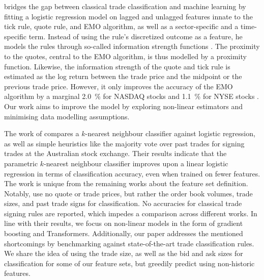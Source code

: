 \textcite[5]{rosenthalModelingTradeDirection2012} bridges the gap between classical trade classification and machine learning by fitting a logistic regression model on lagged and unlagged features innate to the tick rule, quote rule, and \gls{EMO} algorithm, as well as a sector-specific and a time-specific term. Instead of using the rule's discretized outcome as a feature, he models the rules through so-called information strength functions \autocite[6--7]{rosenthalModelingTradeDirection2012}. The proximity to the quotes, central to the \gls{EMO} algorithm, is thus modelled by a proximity function. Likewise, the information strength of the quote and tick rule is estimated as the log return between the trade price and the midpoint or the previous trade price. However, it only improves the accuracy of the \gls{EMO} algorithm by a marginal \SI{2.0}{\percent} for \gls{NASDAQ} stocks and \SI{1.1}{\percent} for \gls{NYSE} stocks \autocite[15]{rosenthalModelingTradeDirection2012}. Our work aims to improve the model by exploring non-linear estimators and minimising data modelling assumptions.

The work of \textcite[483]{blazejewskiLocalNonParametricModel2005} compares a $k$-nearest neighbour classifier against logistic regression, as well as simple heuristics like the majority vote over past trades for signing trades at the Australian stock exchange. Their results indicate that the parametric $k$-nearest neighbour classifier improves upon a linear logistic regression in terms of classification accuracy, even when trained on fewer features. The work is unique from the remaining works about the feature set definition. Notably, \textcite[483]{blazejewskiLocalNonParametricModel2005} use no quote or trade prices, but rather the order book volumes, trade sizes, and past trade signs for classification. No accuracies for classical trade signing rules are reported, which impedes a comparison across different works. In line with their results, we focus on non-linear models in the form of gradient boosting and Transformers. Additionally, our paper addresses the mentioned shortcomings by benchmarking against state-of-the-art trade classification rules. We share the idea of using the trade size, as well as the bid and ask sizes for classification for some of our feature sets, but greedily predict using non-historic features.

